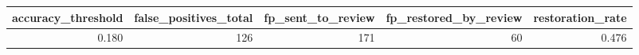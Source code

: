 \begin{tabular}{rrrrr}
\toprule
accuracy_threshold & false_positives_total & fp_sent_to_review & fp_restored_by_review & restoration_rate \\
\midrule
0.180 & 126 & 171 & 60 & 0.476 \\
\bottomrule
\end{tabular}
